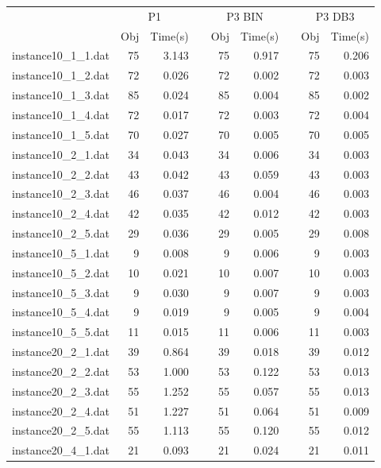 \begin{table}[h!]\centering
{}
\begin{tabular}{@{}rrrcrrcrr@{}}\toprule
& \multicolumn{2}{c}{P1} & \phantom{abc} & \multicolumn{2}{c}{P3 BIN} & \phantom{abc} & \multicolumn{2}{c}{P3 DB3}\\
\cmidrule{2-3} \cmidrule{5-6} \cmidrule{8-9}
& Obj & Time(s) & & Obj & Time(s) & & Obj & Time(s)\\ \midrule
instance10\_1\_1.dat & 75 & 3.143 & & 75 & 0.917 & & 75 & 0.206 \\
instance10\_1\_2.dat & 72 & 0.026 & & 72 & 0.002 & & 72 & 0.003 \\
instance10\_1\_3.dat & 85 & 0.024 & & 85 & 0.004 & & 85 & 0.002 \\
instance10\_1\_4.dat & 72 & 0.017 & & 72 & 0.003 & & 72 & 0.004 \\
instance10\_1\_5.dat & 70 & 0.027 & & 70 & 0.005 & & 70 & 0.005 \\
instance10\_2\_1.dat & 34 & 0.043 & & 34 & 0.006 & & 34 & 0.003 \\
instance10\_2\_2.dat & 43 & 0.042 & & 43 & 0.059 & & 43 & 0.003 \\
instance10\_2\_3.dat & 46 & 0.037 & & 46 & 0.004 & & 46 & 0.003 \\
instance10\_2\_4.dat & 42 & 0.035 & & 42 & 0.012 & & 42 & 0.003 \\
instance10\_2\_5.dat & 29 & 0.036 & & 29 & 0.005 & & 29 & 0.008 \\
instance10\_5\_1.dat & 9 & 0.008 & & 9 & 0.006 & & 9 & 0.003 \\
instance10\_5\_2.dat & 10 & 0.021 & & 10 & 0.007 & & 10 & 0.003 \\
instance10\_5\_3.dat & 9 & 0.030 & & 9 & 0.007 & & 9 & 0.003 \\
instance10\_5\_4.dat & 9 & 0.019 & & 9 & 0.005 & & 9 & 0.004 \\
instance10\_5\_5.dat & 11 & 0.015 & & 11 & 0.006 & & 11 & 0.003 \\
instance20\_2\_1.dat & 39 & 0.864 & & 39 & 0.018 & & 39 & 0.012 \\
instance20\_2\_2.dat & 53 & 1.000 & & 53 & 0.122 & & 53 & 0.013 \\
instance20\_2\_3.dat & 55 & 1.252 & & 55 & 0.057 & & 55 & 0.013 \\
instance20\_2\_4.dat & 51 & 1.227 & & 51 & 0.064 & & 51 & 0.009 \\
instance20\_2\_5.dat & 55 & 1.113 & & 55 & 0.120 & & 55 & 0.012 \\
instance20\_4\_1.dat & 21 & 0.093 & & 21 & 0.024 & & 21 & 0.011 \\

\end{tabular}
\end{table}
